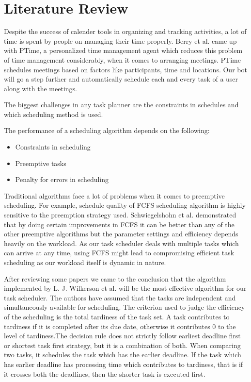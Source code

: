 \documentclass{sig-alternate-05-2015}
\begin{document}
\section{Literature Review}
Despite the success of calender tools in organizing and tracking activities, a lot of time is spent by people on managing their time properly. Berry et al.\cite{planner2} came up with PTime, a personalized time management agent which reduces this problem of time management considerably, when it comes to arranging meetings. PTime schedules meetings based on factors like participants, time and locations. Our bot will go a step further and automatically schedule each and every task of a user along with the meetings.
\par
The biggest challenges in any task planner are the constraints in schedules and which scheduling method is used.
\par
The performance of a scheduling algorithm depends on the following:
\begin{itemize}
  \item Constraints in scheduling
  \item Preemptive tasks
  \item Penalty for errors in scheduling
\end{itemize}
\par
Traditional algorithms face a lot of problems when it comes to preemptive scheduling. For example, schedule quality of FCFS scheduling algorithm is highly sensitive to the preemption strategy used. Schwiegelshohn et al.\cite{planner3} demonstrated that by doing certain improvements in FCFS it can be better than any of the other preemptive algorithms but the parameter settings and efficiency depends heavily on the workload. As our task scheduler deals with multiple tasks which can arrive at any time, using FCFS might lead to compromising efficient task scheduling as our workload itself is dynamic in nature.
\par
After reviewing some papers we came to the conclusion that the algorithm implemented by L. J. Wilkerson et al.\cite{planner4} will be the most effective algorithm for our task scheduler. The authors have assumed that the tasks are independent and simultaneously available for scheduling. The criterion used to judge the efficiency of the scheduling is the total tardiness of the task set. A task contributes to tardiness if it is completed after its due date, otherwise it contributes 0 to the level of tardiness.The decision rule does not strictly follow earliest deadline first or shortest task first strategy, but it is a combination of both. When comparing two tasks, it schedules the task which has the earlier deadline. If the task which has earlier deadline has processing time which contributes to tardiness, that is if it crosses both the deadlines, then the shorter task is executed first.
\end{document}
